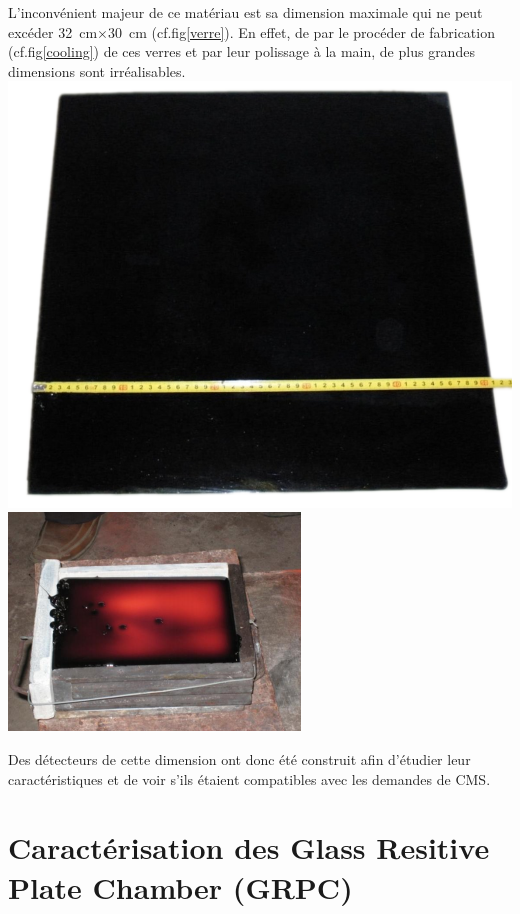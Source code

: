 L'inconvénient majeur de ce matériau est sa dimension maximale qui ne peut excéder \SI{32}{\centi\meter}$\times$\SI{30}{\centi\meter} (cf.fig\ref{verre}). En effet, de par le procéder de fabrication (cf.fig\ref{cooling}) de ces verres et par leur polissage à la main, de plus grandes dimensions sont irréalisables.
\marginpar
{
	\centering
	\includegraphics[width=\marginparwidth]{GLA/verre.png}
	\label{verre}
}
\marginpar
{
	\centering
	\includegraphics[width=\marginparwidth]{GLA/cooling.png}
	\label{cooling}
}

Des détecteurs de cette dimension ont donc été construit afin d'étudier leur caractéristiques et de voir s'ils étaient compatibles avec les demandes de CMS.

\section{Caractérisation des Glass Resitive Plate Chamber (GRPC)}
 
